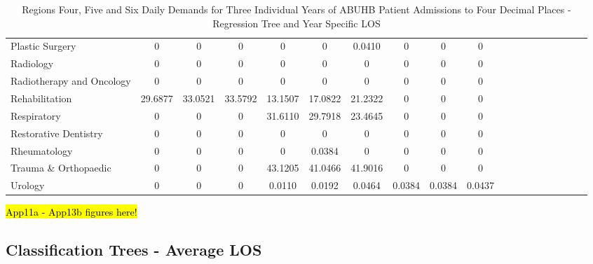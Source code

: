 \documentclass[thesis.tex]{subfiles}
\begin{document}
\begin{landscape}
\begin{table}[h!]
{\begin{tabular}{lcccccccccccccccccc}
Plastic Surgery&	0&	0&	0	&0	&0	&0.0410&	0	&0	&0\\
Radiology	&0&	0&	0&	0&	0&	0	&0	&0	&0\\
Radiotherapy and Oncology&	0&	0&	0	&0&	0	&0	&0	&0&	0\\
Rehabilitation&	29.6877&	33.0521	&33.5792	&13.1507&	17.0822&	21.2322	&0&	0&	0\\
Respiratory	&0	&0	&0&31.6110	&29.7918	&23.4645&	0&	0&	0\\
Restorative Dentistry	&0&	0	&0	&0	&0	&0	&0	&0&	0\\
Rheumatology	&0	&0&	0	&0	&0.0384	&0	&0&	0	&0\\
Trauma \& Orthopaedic	&0&	0	&0	&43.1205	&41.0466	&41.9016&	0	&0	&0\\
Urology	&0	&0	&0&	0.0110	&0.0192	&0.0464	&0.0384	&0.0384&	0.0437\\
\bottomrule
\end{tabular}} 
\caption{Regions Four, Five and Six Daily Demands for Three Individual Years of ABUHB Patient Admissions to Four Decimal Places - Regression Tree and Year Specific LOS}
    \label{apptab:LinkedDemands5a}
\end{table}

\end{landscape}
\hl{App11a - App13b figures here!}

\subsection{Classification Trees - Average LOS}
\end{document}
